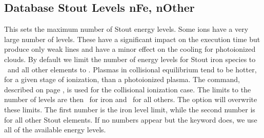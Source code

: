 \subsection{Database Stout Levels nFe, nOther} 
This sets the maximum number of Stout energy levels. 
Some ions have a very large number of levels.
These have a significant impact
on the execution time but produce only weak lines and have a minor effect
on the cooling for photoionized clouds.
By default we limit the number of energy levels for Stout iron species to 
\nDefaultPhotoLevelsFe\ and all other elements to \nDefaultPhotoLevels.
Plasmas in collisional equilibrium tend to be hotter, for a given
stage of ionization, than a photoionized plasma.  
The  command, described on
page \pageref{sec:CommandCoronalEquilibrium}, is used for
the collisional ionization case.
The limits to the number of levels are then \nDefaultCollLevelsFe\ for iron 
and \nDefaultCollLevels\ for all others.
The  option will overwrite these limits.
The first number is the iron level limit, while the second number 
is for all other Stout elements.
If no numbers appear but the keyword  does, we use all 
of the available energy levels.

